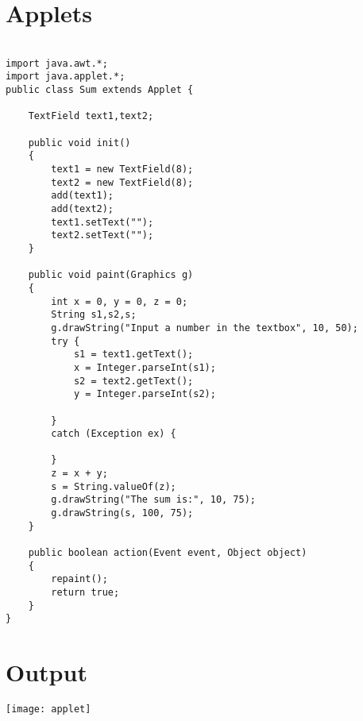 \pagebreak{}
\section{Applets}
\begin{verbatim}

import java.awt.*;
import java.applet.*;
public class Sum extends Applet {

    TextField text1,text2;

    public void init()
    {
        text1 = new TextField(8);
        text2 = new TextField(8);
        add(text1);
        add(text2);
        text1.setText("");
        text2.setText("");
    }

    public void paint(Graphics g)
    {
        int x = 0, y = 0, z = 0;
        String s1,s2,s;
        g.drawString("Input a number in the textbox", 10, 50);
        try {
            s1 = text1.getText();
            x = Integer.parseInt(s1);
            s2 = text2.getText();
            y = Integer.parseInt(s2);

        }
        catch (Exception ex) {

        }
        z = x + y;
        s = String.valueOf(z);
        g.drawString("The sum is:", 10, 75);
        g.drawString(s, 100, 75);
    }

    public boolean action(Event event, Object object)
    {
        repaint();
        return true;
    }
}
\end{verbatim}
\section*{Output}
\texttt{[image: applet]}